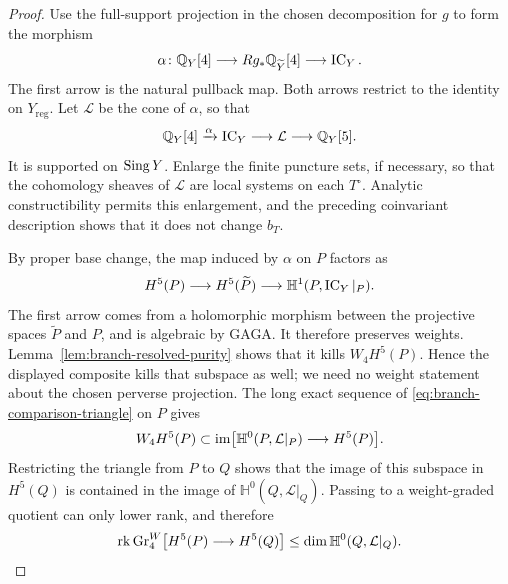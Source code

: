 \begin{proof}
Use the full-support projection in the chosen decomposition for $g$
to form the morphism
\[
 \alpha\colon\mathbb{Q}_Y[4]\longrightarrow Rg_*\mathbb{Q}_{\widetilde Y}[4]
                                      \longrightarrow\operatorname{IC}_Y.
\]
The first arrow is the natural pullback map.  Both arrows restrict
to the identity on $Y_{\mathrm{reg}}$.  Let $\mathcal L$ be the cone
of $\alpha$, so that
\begin{equation}\label{eq:branch-comparison-triangle}
 \mathbb{Q}_Y[4]\xrightarrow{\alpha}\operatorname{IC}_Y\longrightarrow\mathcal L
                                      \longrightarrow\mathbb{Q}_Y[5].
\end{equation}
It is supported on $\operatorname{Sing} Y$.
Enlarge the finite puncture sets, if necessary, so that the cohomology
sheaves of $\mathcal L$ are local systems on each $T^\circ$.  Analytic
constructibility permits this enlargement, and the preceding
coinvariant description shows that it does not change $b_T$.

By proper base change, the map induced by $\alpha$ on $P$ factors as
\[
 H^5(P)\longrightarrow H^5(\widetilde P)
           \longrightarrow\mathbb H^1(P,\operatorname{IC}_Y|_P).
\]
The first arrow comes from a holomorphic morphism between the
projective spaces $\widetilde P$ and $P$, and is algebraic by GAGA.
It therefore preserves weights.  Lemma~\ref{lem:branch-resolved-purity}
shows that it kills $W_4H^5(P)$.  Hence the displayed composite kills
that subspace as well; we need no weight statement about the chosen
perverse projection.  The long exact sequence of
\eqref{eq:branch-comparison-triangle} on $P$ gives
\[
 W_4H^5(P)\subset
 \operatorname{im}\bigl[\mathbb H^0(P,\mathcal L|_P)\longrightarrow H^5(P)\bigr].
\]
Restricting the triangle from $P$ to $Q$ shows that the image of this
subspace in $H^5(Q)$ is contained in the image of
$\mathbb H^0(Q,\mathcal L|_Q)$.  Passing to a weight-graded quotient
can only lower rank, and therefore
\begin{equation}\label{eq:branch-cone-rank}
 \operatorname{rk}\operatorname{Gr}^W_4\bigl[H^5(P)\longrightarrow H^5(Q)\bigr]
        \leq\dim\mathbb H^0(Q,\mathcal L|_Q).
\end{equation}


\end{proof}

